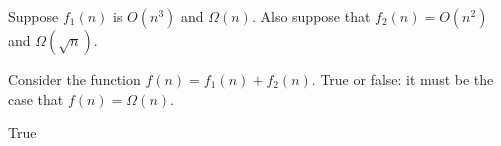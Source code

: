 \begin{prob}
    Suppose $f_1(n)$ is $O(n^3)$ and $\Omega(n)$. Also suppose that $f_2(n) = O(n^2)$ and $\Omega(\sqrt n)$.

    Consider the function $f(n) = f_1(n) + f_2(n)$. True or false: it must be 
    the case that $f(n) = \Omega(n)$.

    \Tf{}

    \begin{soln}
        True
    \end{soln}
\end{prob}
